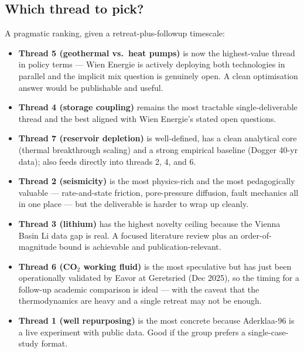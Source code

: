 \documentclass{article}
\begin{document}
\subsection*{Which thread to pick?}

A pragmatic ranking, given a retreat-plus-followup timescale:

\begin{itemize}
\item \textbf{Thread 5 (geothermal vs.\ heat pumps)} is now the
highest-value thread in policy terms --- Wien Energie is actively
deploying both technologies in parallel and the implicit mix
question is genuinely open. A clean optimisation answer would be
publishable and useful.
\item \textbf{Thread 4 (storage coupling)} remains the most tractable
single-deliverable thread and the best aligned with Wien Energie's
stated open questions.
\item \textbf{Thread 7 (reservoir depletion)} is well-defined, has a
clean analytical core (thermal breakthrough scaling) and a strong
empirical baseline (Dogger 40-yr data); also feeds directly into
threads 2, 4, and 6.
\item \textbf{Thread 2 (seismicity)} is the most physics-rich and the
most pedagogically valuable --- rate-and-state friction, pore-pressure
diffusion, fault mechanics all in one place --- but the deliverable
is harder to wrap up cleanly.
\item \textbf{Thread 3 (lithium)} has the highest novelty ceiling
because the Vienna Basin Li data gap is real. A focused literature
review plus an order-of-magnitude bound is achievable and
publication-relevant.
\item \textbf{Thread 6 (CO$_2$ working fluid)} is the most speculative
but has just been operationally validated by Eavor at Geretsried
(Dec 2025), so the timing for a follow-up academic comparison is
ideal --- with the caveat that the thermodynamics are heavy and a
single retreat may not be enough.
\item \textbf{Thread 1 (well repurposing)} is the most concrete
because Aderklaa-96 is a live experiment with public data. Good if
the group prefers a single-case-study format.
\end{itemize}
\end{document}
